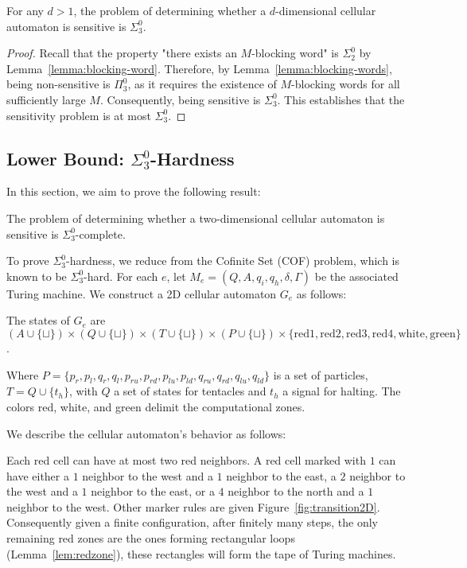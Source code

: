 \documentclass{llncs}
\begin{document}
\begin{lemma}\label{lemma:uBound}
For any $d > 1$, the problem of determining whether a $d$-dimensional cellular automaton is sensitive is $\Sigma^0_3$.
\end{lemma}

\begin{proof}
Recall that the property "there exists an $M$-blocking word" is $\Sigma^0_2$ by Lemma~\ref{lemma:blocking-word}. Therefore, by Lemma~\ref{lemma:blocking-words}, being non-sensitive is $\Pi^0_3$, as it requires the existence of $M$-blocking words for all sufficiently large $M$. Consequently, being sensitive is $\Sigma^0_3$. This establishes that the sensitivity problem is at most $\Sigma^0_3$.
\end{proof}



\subsection{Lower Bound: $\Sigma^0_3$-Hardness}

In this section, we aim to prove the following result:

\begin{theorem}\label{thm:2D}
The problem of determining whether a two-dimensional cellular automaton is sensitive is $\Sigma^0_3$-complete.
\end{theorem}

To prove $\Sigma^0_3$-hardness, we reduce from the Cofinite Set (COF) problem, which is known to be $\Sigma^0_3$-hard. For each $e$, let $M_e = (Q, A, q_i, q_h, \delta, \Gamma)$ be the associated Turing machine. We construct a 2D cellular automaton $G_e$ as follows:



The states of $G_e$ are $(A \cup \{\sqcup\}) \times (Q \cup \{\sqcup\})  \times (T \cup \{\sqcup\}) \times (P \cup \{\sqcup\}) \times \{\text{red1}, \text{red2}, \text{red3}, \text{red4}, \text{white}, \text{green}\}$.

Where $P= \{p_r, p_l, q_r, q_l, p_{ru}, p_{rd}, p_{lu}, p_{ld}, q_{ru}, q_{rd}, q_{lu}, q_{ld}\}$ is a set of particles, $T = Q\cup \{t_h\}$, with $Q$ a set of states for tentacles and $t_h$ a signal for halting. The colors red, white, and green delimit the computational zones. 

We describe the cellular automaton's behavior as follows:

Each red cell can have at most two red neighbors. A red cell marked with $1$ can have either a $1$ neighbor to the west and a $1$ neighbor to the east, a $2$ neighbor to the west and a $1$ neighbor to the east, or a $4$ neighbor to the north and a $1$ neighbor to the west. Other marker rules are given Figure~\ref{fig:transition2D}. Consequently given a finite configuration, after finitely many steps, the only remaining red zones are the ones forming rectangular loops (Lemma~\ref{lem:redzone}),  these rectangles will form the tape of Turing machines. 
\end{document}
